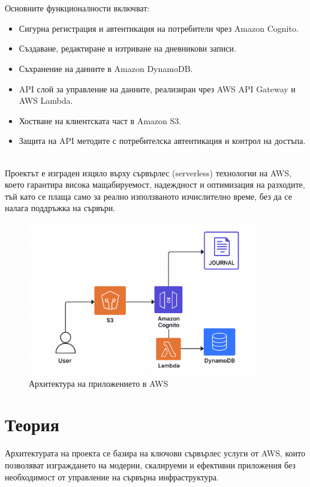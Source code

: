 \documentclass[12pt]{article}
\begin{document}
\\
\\
\noindent Основните функционалности включват:
\begin{itemize}
\item Сигурна регистрация и автентикация на потребители чрез Amazon Cognito.
\item Създаване, редактиране и изтриване на дневникови записи.
\item Съхранение на данните в Amazon DynamoDB.
\item API слой за управление на данните, реализиран чрез AWS API Gateway и AWS Lambda.
\item Хостване на клиентската част в Amazon S3.
\item Защита на API методите с потребителска автентикация и контрол на достъпа.
\end{itemize}
\\
\noindent Проектът е изграден изцяло върху сървърлес (serverless) технологии на AWS, което гарантира висока мащабируемост, надеждност и оптимизация на разходите, тъй като се плаща само за реално използваното изчислително време, без да се налага поддръжка на сървъри.

\begin{figure}[H]
\centering
\includegraphics[width=0.9\textwidth]{architecture.png}
\caption{Архитектура на приложението в AWS}
\end{figure}


\section{Теория}
\noindent Архитектурата на проекта се базира на ключови сървърлес услуги от AWS, които позволяват изграждането на модерни, скалируеми и ефективни приложения без необходимост от управление на сървърна инфраструктура.
\end{document}
